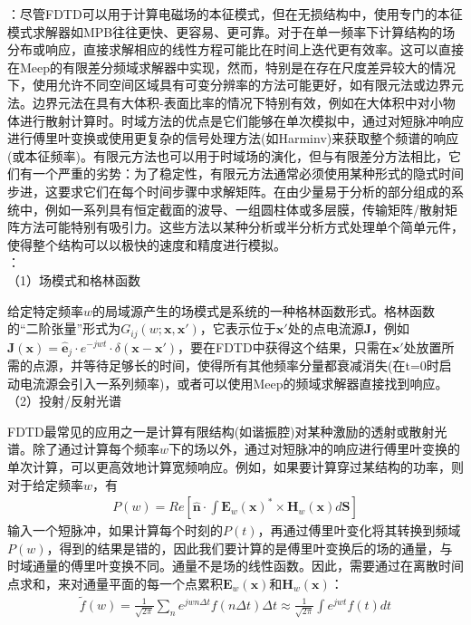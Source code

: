 \documentclass{article}
\numberwithin{equation}{section}
\renewcommand{\vec}[1]{\boldsymbol{#1}}
\begin{document}
\textbf{\color{blue}{Meep的优缺点}}：尽管FDTD可以用于计算电磁场的本征模式，但在无损结构中，使用专门的本征模式求解器如MPB往往更快、更容易、更可靠。对于在单一频率下计算结构的场分布或响应，直接求解相应的线性方程可能比在时间上迭代更有效率。这可以直接在Meep的有限差分频域求解器中实现，然而，特别是在存在尺度差异较大的情况下，使用允许不同空间区域具有可变分辨率的方法可能更好，如有限元法或边界元法。边界元法在具有大体积-表面比率的情况下特别有效，例如在大体积中对小物体进行散射计算时。时域方法的优点是它们能够在单次模拟中，通过对短脉冲响应进行傅里叶变换或使用更复杂的信号处理方法(如Harminv)来获取整个频谱的响应(或本征频率)。有限元方法也可以用于时域场的演化，但与有限差分方法相比，它们有一个严重的劣势：为了稳定性，有限元方法通常必须使用某种形式的隐式时间步进，这要求它们在每个时间步骤中求解矩阵。在由少量易于分析的部分组成的系统中，例如一系列具有恒定截面的波导、一组圆柱体或多层膜，传输矩阵/散射矩阵方法可能特别有吸引力。这些方法以某种分析或半分析方式处理单个简单元件，使得整个结构可以以极快的速度和精度进行模拟。\\
\textbf{\color{blue}{Meep的应用}}：\\
（1）场模式和格林函数\par
给定特定频率$w$的局域源产生的场模式是系统的一种格林函数形式。格林函数的“二阶张量”形式为$G_{ij}(w;\vec{x},\vec{x}')$，它表示位于$\vec{x}'$处的点电流源$\mathbf{J}$，例如$\mathbf{J}(\vec{x})=\hat{\vec{e}}_j\cdot e^{-jwt}\cdot\delta(\vec{x}-\vec{x}')$，要在FDTD中获得这个结果，只需在$\vec{x}'$处放置所需的点源，并等待足够长的时间，使得所有其他频率分量都衰减消失(在t=0时启动电流源会引入一系列频率)，或者可以使用Meep的频域求解器直接找到响应。\\
（2）投射/反射光谱\par
FDTD最常见的应用之一是计算有限结构(如谐振腔)对某种激励的透射或散射光谱。除了通过计算每个频率$w$下的场以外，通过对短脉冲的响应进行傅里叶变换的单次计算，可以更高效地计算宽频响应。例如，如果要计算穿过某结构的功率，则对于给定频率$w$，有
\begin{align}
    P(w)=Re\left[\hat{\vec{n}}\cdot\int\mathbf{E}_w(\vec{x})^*\times\mathbf{H}_w(\vec{x})d\vec{S}\right]
\end{align}
输入一个短脉冲，如果计算每个时刻的$P(t)$，再通过傅里叶变化将其转换到频域$P(w)$，得到的结果是错的，因此我们要计算的是傅里叶变换后的场的通量，与时域通量的傅里叶变换不同。通量不是场的线性函数。因此，需要通过在离散时间点求和，来对通量平面的每一个点累积$\mathbf{E}_w(\vec{x})$和$\mathbf{H}_w(\vec{x})$：
\begin{align}
    \tilde{f}(w)=\frac{1}{\sqrt{2\pi}}\sum_ne^{jwn\Delta t}f(n\Delta t)\Delta t\approx \frac{1}{\sqrt{2\pi}}\int e^{jwt}f(t)dt
\end{align}
\end{document}

